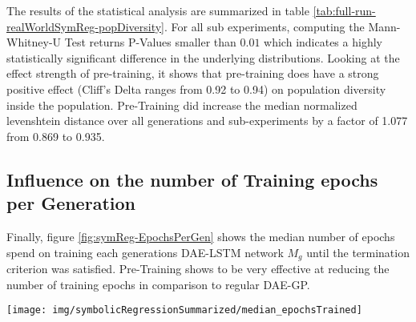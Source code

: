 \documentclass[
  11pt,
]{article}
\let\origfigure\figure
\let\endorigfigure\endfigure
\renewenvironment{figure}[1][2] {
    \expandafter\origfigure\expandafter[H]
} {
    \endorigfigure
}
\begin{document}
The results of the statistical analysis are summarized in table \ref{tab:full-run-realWorldSymReg-popDiversity}.
For all sub experiments, computing the Mann-Whitney-U Test returns P-Values smaller than \(0.01\) which indicates a highly statistically significant difference in the underlying distributions.
Looking at the effect strength of pre-training, it shows that pre-training does have a strong positive effect (Cliff's Delta ranges from 0.92 to 0.94) on population diversity inside the population.
Pre-Training did increase the median normalized levenshtein distance over all generations and sub-experiments by a factor of 1.077 from 0.869 to 0.935.

\hypertarget{influence-on-the-number-of-training-epochs-per-generation}{%
\subsection{Influence on the number of Training epochs per Generation}\label{influence-on-the-number-of-training-epochs-per-generation}}

Finally, figure \ref{fig:symReg-EpochsPerGen} shows the median number of epochs spend on training each generations DAE-LSTM network \(M_g\) until the termination criterion was satisfied.
Pre-Training shows to be very effective at reducing the number of training epochs in comparison to regular DAE-GP.

\begin{figure}[c]

{\centering \texttt{[image: img/symbolicRegressionSummarized/median\_epochsTrained]} 

}

\caption{Training Epochs over 30 Generations - Real World Symbolic Regression}\label{fig:symReg-EpochsPerGen}
\end{figure}
\end{document}
